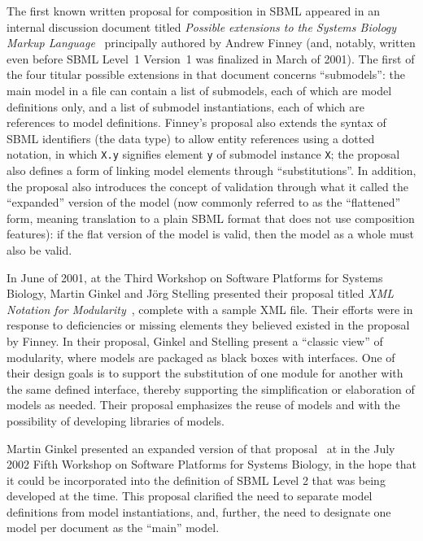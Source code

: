 The first known written proposal for composition in SBML appeared in an
internal discussion document titled \emph{Possible extensions to the
  Systems Biology Markup Language}~\citep{finney:2000} principally authored by
Andrew Finney (and, notably, written even before SBML Level~1 Version~1
was finalized in March of 2001).  The first of the four titular possible
extensions in that document concerns ``submodels'': the main model in a
file can contain a list of submodels, each of which are model
definitions only, and a list of submodel instantiations, each of which
are references to model definitions.  Finney's proposal also
extends the syntax of SBML identifiers (the  data type) to
allow entity references using a dotted notation, in which \texttt{X.y}
signifies element \texttt{y} of submodel instance \texttt{X}; the
proposal also defines a form of linking model elements through
``substitutions''.  In addition, the proposal also introduces the
concept of validation through what it called the ``expanded'' version of
the model (now commonly referred to as the ``flattened'' form, meaning
translation to a plain SBML format that does not use composition
features): if the flat version of the model is valid, then the model as
a whole must also be valid.

In June of 2001, at the Third Workshop on Software Platforms for Systems
Biology, Martin Ginkel and J\"{o}rg Stelling presented their proposal titled
\emph{XML Notation for Modularity}~\citep{ginkel:2001}, complete with a
sample XML file.  Their efforts were in response to deficiencies or missing
elements they believed existed in the proposal by Finney.  In their proposal,
Ginkel and Stelling present a ``classic view'' of modularity, where models
are packaged as black boxes with interfaces.  One of their design goals is to
support the substitution of one module for another with the same defined
interface, thereby supporting the simplification or elaboration of models as
needed.  Their proposal emphasizes the reuse of models and with the
possibility of developing libraries of models.

Martin Ginkel presented an expanded version of that
proposal~\citep{ginkel:2002} at in the July 2002 Fifth Workshop on
Software Platforms for Systems Biology, in the hope that it could be
incorporated into the definition of SBML Level 2 that was being
developed at the time.  This proposal clarified the need to separate
model definitions from model instantiations, and, further, the need to
designate one model per document as the ``main'' model.


